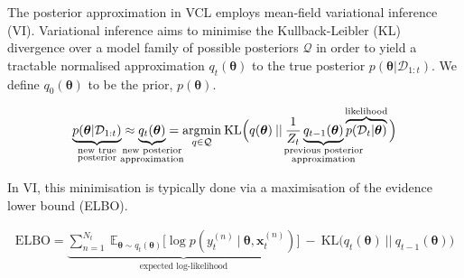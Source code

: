 \documentclass[a4paper,10pt]{article}
\let\boldtheta\theta %
\renewcommand{\theta}{\boldsymbol{\boldtheta}} %
\newcommand{\x}{\mathbf{x}}
\begin{document}
The posterior approximation in VCL employs mean-field variational inference (VI). Variational inference aims to minimise the Kullback-Leibler (KL) divergence over a model family of possible posteriors $\mathcal{Q}$ in order to yield a tractable normalised approximation $q_t(\theta)$ to the true posterior $p(\theta | \mathcal{D}_{1:t})$. We define $q_0(\theta)$ to be the prior, $p(\theta)$.

\vspace{-2.em}
\begin{equation}\label{eq:3}
\begin{split}
\underbrace{p(\theta | \mathcal{D}_{1:t})}_{\mathclap{\substack{\text{new true}\\ \text{posterior}}}}\approx \underbrace{q_t(\theta)}_{\mathclap{\substack{\text{new posterior}\\ \text{approximation}}}} &=\underset{q\in\mathcal{Q}}{\mathrm{arg}\mathrm{min}} \: \mathrm{KL}\Big(q(\theta)\:||\:\frac{1}{Z_t}\underbrace{q_{t-1}(\theta)}_{\mathclap{\substack{\text{previous posterior} \\ \text{approximation}}}}\overbrace{p(\mathcal{D}_t|\theta)}^{\mathclap{\text{likelihood}}} \Big)\\
\end{split}
\end{equation}

\vspace{-0.6em}
In VI, this minimisation is typically done via a maximisation of the evidence lower bound (ELBO). 

\vspace{-1.95em}
\begin{equation}\label{eq:4}
\begin{split}
\mathrm{ELBO}= \underbrace{{\textstyle\sum}_{n=1}^{N_t} \> \mathds{E}_{\theta \sim q_t(\theta)}\big[\log p(y_t^{(n)} \:| \:\theta, \x_t^{(n)})\big]}_{\text{expected log-likelihood}} \> -  \> \mathrm{KL}\big(q_t(\theta)\:||\:q_{t-1}(\theta)\big)
\end{split}
\end{equation} %
\end{document}
